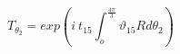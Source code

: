 \begin{equation}
T_{\theta_2}= exp\left( i~t_{15}\int_o^{\frac{4\pi}{3}}\vartheta_{15} R 
d\theta_2\right )
\end{equation}

